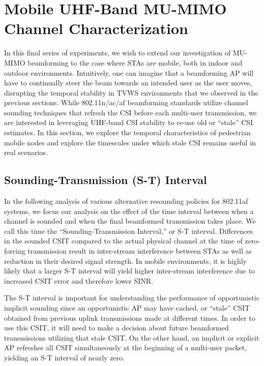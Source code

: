 \pagebreak
\section{Mobile UHF-Band MU-MIMO Channel Characterization}
\label{sec:uhf_mobile}

	In this final series of experiments, we wish to extend our investigation of \ac{MU-MIMO} beamforming to the case where \acp{STA} are mobile, both in indoor and outdoor environments.
	Intuitively, one can imagine that a beamforming \ac{AP} will have to continually steer the beam towards an intended user as the user moves, disrupting the temporal stability in \ac{TVWS} environments that we observed in the previous sections.
	While 802.11n/ac/af beamforming standards utilize channel sounding techniques that refresh the \ac{CSI} before each multi-user transmission, we are interested in leveraging UHF-band \ac{CSI} stability to re-use old or ``stale'' \ac{CSI} estimates.
	In this section, we explore the temporal characteristics of pedestrian mobile nodes and explore the timescales under which stale \ac{CSI} remains useful in real scenarios.

\subsection{Sounding-Transmission (S-T) Interval}
\label{sec_st_interval}

	In the following analysis of various alternative resounding policies for 802.11af systems, we focus our analysis on the effect of the time interval between when a channel is sounded and when the final beamformed transmission takes place.
	We call this time the ``Sounding-Transmission Interval,'' or S-T interval.
	Differences in the sounded \ac{CSIT} compared to the actual physical channel at the time of zero-forcing transmission result in inter-stream interference between \acp{STA} as well as reduction in their desired signal strength.
	In mobile environments, it is highly likely that a larger S-T interval will yield higher inter-stream interference due to increased \ac{CSIT} error and therefore lower \ac{SINR}.
	

	The S-T interval is important for understanding the performance of opportunistic implicit sounding since an opportunistic \ac{AP} may have cached, or ``stale'' \ac{CSIT} obtained from previous uplink transmissions made at different times.
	In order to use this \ac{CSIT}, it will need to make a decision about future beamformed transmissions utilizing that stale \ac{CSIT}.
	On the other hand, an implicit or explicit \ac{AP} refreshes all \ac{CSIT} simultaneously at the beginning of a multi-user packet, yielding an S-T interval of nearly zero.
	
